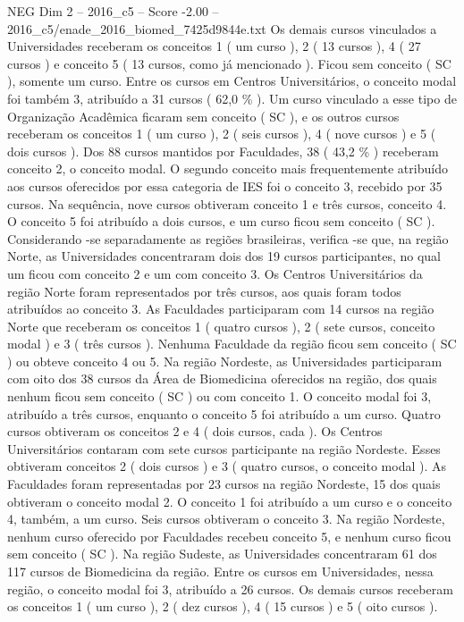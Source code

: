\begin{textsample}{NEG Dim 2 – 2016\_c5 – Score -2.00 – 2016\_c5/enade\_2016\_biomed\_7425d9844e.txt}
Os demais cursos vinculados a Universidades receberam os conceitos 1 ( um curso ), 2 ( 13 cursos ), 4 ( 27 cursos ) e conceito 5 ( 13 cursos, como já mencionado ).
Ficou sem conceito ( SC ), somente um curso.
Entre os cursos em Centros Universitários, o conceito modal foi também 3, atribuído a 31 cursos ( 62,0 \% ).
Um curso vinculado a esse tipo de Organização Acadêmica ficaram sem conceito ( SC ), e os outros cursos receberam os conceitos 1 ( um curso ), 2 ( seis cursos ), 4 ( nove cursos ) e 5 ( dois cursos ).
Dos 88 cursos mantidos por Faculdades, 38 ( 43,2 \% ) receberam conceito 2, o conceito modal.
O segundo conceito mais frequentemente atribuído aos cursos oferecidos por essa categoria de IES foi o conceito 3, recebido por 35 cursos.
Na sequência, nove cursos obtiveram conceito 1 e três cursos, conceito 4.
O conceito 5 foi atribuído a dois cursos, e um curso ficou sem conceito ( SC ).
Considerando -se separadamente as regiões brasileiras, verifica -se que, na região Norte, as Universidades concentraram dois dos 19 cursos participantes, no qual um ficou com conceito 2 e um com conceito 3.
Os Centros Universitários da região Norte foram representados por três cursos, aos quais foram todos atribuídos ao conceito 3.
As Faculdades participaram com 14 cursos na região Norte que receberam os conceitos 1 ( quatro cursos ), 2 ( sete cursos, conceito modal ) e 3 ( três cursos ).
Nenhuma Faculdade da região ficou sem conceito ( SC ) ou obteve conceito 4 ou 5.
Na região Nordeste, as Universidades participaram com oito dos 38 cursos da Área de Biomedicina oferecidos na região, dos quais nenhum ficou sem conceito ( SC ) ou com conceito 1.
O conceito modal foi 3, atribuído a três cursos, enquanto o conceito 5 foi atribuído a um curso.
Quatro cursos obtiveram os conceitos 2 e 4 ( dois cursos, cada ).
Os Centros Universitários contaram com sete cursos participante na região Nordeste.
Esses obtiveram conceitos 2 ( dois cursos ) e 3 ( quatro cursos, o conceito modal ).
As Faculdades foram representadas por 23 cursos na região Nordeste, 15 dos quais obtiveram o conceito modal 2.
O conceito 1 foi atribuído a um curso e o conceito 4, também, a um curso.
Seis cursos obtiveram o conceito 3.
Na região Nordeste, nenhum curso oferecido por Faculdades recebeu conceito 5, e nenhum curso ficou sem conceito ( SC ).
Na região Sudeste, as Universidades concentraram 61 dos 117 cursos de Biomedicina da região.
Entre os cursos em Universidades, nessa região, o conceito modal foi 3, atribuído a 26 cursos.
Os demais cursos receberam os conceitos 1 ( um curso ), 2 ( dez cursos ), 4 ( 15 cursos ) e 5 ( oito cursos ).

\end{textsample}
